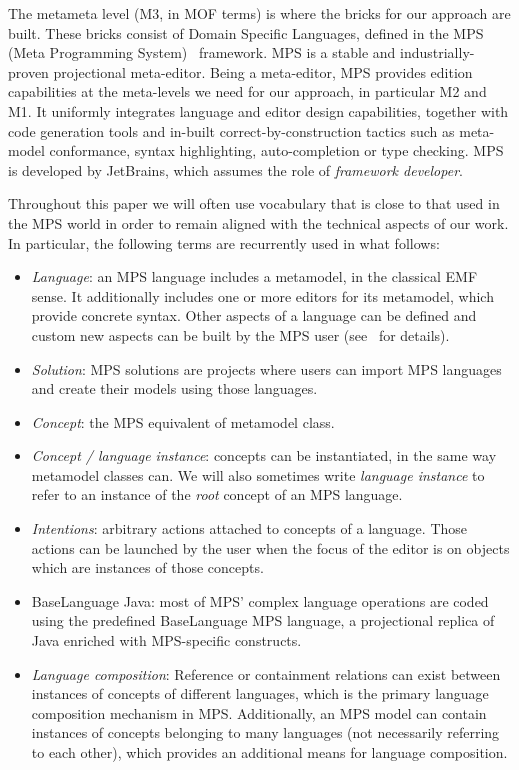 The metameta level (M3, in MOF terms) is where the bricks for our approach are
built. These bricks consist of Domain Specific Languages, defined in the MPS
(Meta Programming System)~\cite{mps} framework. MPS is a stable and
industrially-proven projectional meta-editor. Being a meta-editor, MPS provides edition
capabilities at the meta-levels we need for our approach, in particular M2 and
M1. It uniformly integrates language and editor design capabilities, together
with code generation tools and in-built correct-by-construction tactics such as meta-model
conformance, syntax highlighting, auto-completion or type checking.  
MPS is developed by JetBrains, which assumes the role of \emph{framework
developer}. 

Throughout this paper we will often use vocabulary that is close to that used in
the MPS world in order to remain aligned with the technical aspects of our
work. In particular, the following terms are recurrently used in what follows:

\begin{itemize}
  \item \emph{Language}: an MPS language includes a metamodel, in the classical
  EMF sense. It additionally includes one or more editors for its metamodel,
  which provide concrete syntax. Other aspects of a language
  can be defined and custom new aspects can be
  built by the MPS user (see~\cite{mps} for details).
  \item \emph{Solution}: MPS solutions are projects where users can import
  MPS languages and create their models using those languages.
  \item \emph{Concept}: the MPS equivalent of metamodel class.
  \item \emph{Concept / language instance}: concepts can be instantiated, in
  the same way metamodel classes can. We will also sometimes write
  \emph{language instance} to refer to an instance of the \emph{root} concept of
  an MPS language.
  \item \emph{Intentions}: arbitrary actions attached to concepts of a
  language. Those actions can be launched by the user when the
  focus of the editor is on objects which are instances of those concepts.
  \item \textsf{BaseLanguage Java}: most of MPS' complex language operations are
  coded using the predefined \textsf{BaseLanguage} MPS language, a projectional
  replica of Java enriched with MPS-specific constructs.
  \item \emph{Language composition}:  Reference or containment relations can exist between instances of
  concepts of different languages, which is the primary language composition
  mechanism in MPS. Additionally, an MPS model can contain instances of concepts
  belonging to many languages (not necessarily referring to each other), which
  provides an additional means for language composition.
\end{itemize}

